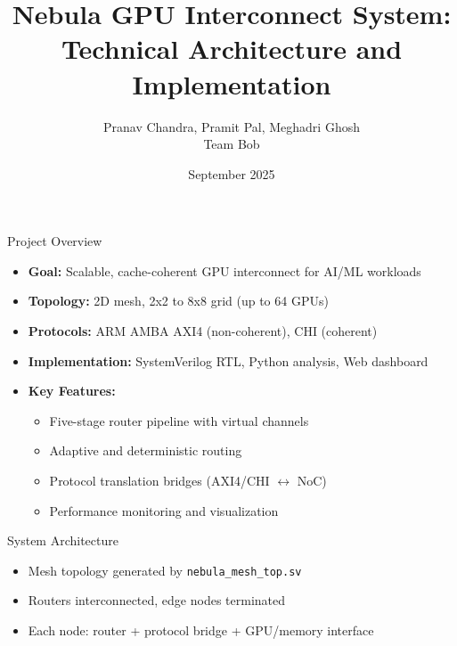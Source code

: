 \documentclass{beamer}
\title[Nebula GPU Interconnect]{Nebula GPU Interconnect System:\\Technical Architecture and Implementation}
\author{Pranav Chandra, Pramit Pal, Meghadri Ghosh\\Team Bob}
\date{September 2025}
\begin{document}
\begin{frame}
  \titlepage
\end{frame}

\begin{frame}{Project Overview}
  \begin{itemize}
    \item \textbf{Goal:} Scalable, cache-coherent GPU interconnect for AI/ML workloads
    \item \textbf{Topology:} 2D mesh, 2x2 to 8x8 grid (up to 64 GPUs)
    \item \textbf{Protocols:} ARM AMBA AXI4 (non-coherent), CHI (coherent)
    \item \textbf{Implementation:} SystemVerilog RTL, Python analysis, Web dashboard
    \item \textbf{Key Features:}
      \begin{itemize}
        \item Five-stage router pipeline with virtual channels
        \item Adaptive and deterministic routing
        \item Protocol translation bridges (AXI4/CHI $\leftrightarrow$ NoC)
        \item Performance monitoring and visualization
      \end{itemize}
  \end{itemize}
\end{frame}

\begin{frame}{System Architecture}
  \begin{itemize}
    \item Mesh topology generated by \texttt{nebula\_mesh\_top.sv}
    \item Routers interconnected, edge nodes terminated
    \item Each node: router + protocol bridge + GPU/memory interface
  \end{itemize}
\end{frame}
\end{document}
